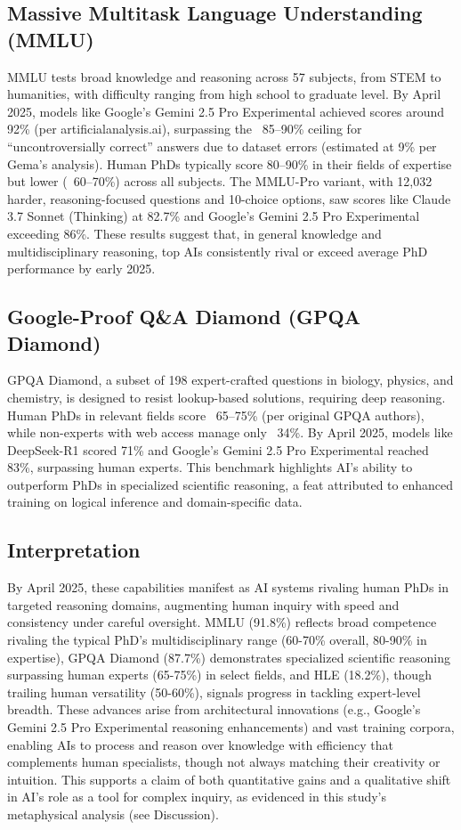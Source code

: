 \documentclass[11pt]{article}
\begin{document}
\subsection{Massive Multitask Language Understanding (MMLU)}
MMLU tests broad knowledge and reasoning across 57 subjects, from STEM to humanities, with difficulty ranging from high school to graduate level. By April 2025, models like Google’s Gemini 2.5 Pro Experimental achieved scores around 92\% (per artificialanalysis.ai), surpassing the ~85–90\% ceiling for “uncontroversially correct” answers due to dataset errors (estimated at 9\% per Gema’s analysis). Human PhDs typically score 80–90\% in their fields of expertise but lower (~60–70\%) across all subjects. The MMLU-Pro variant, with 12,032 harder, reasoning-focused questions and 10-choice options, saw scores like Claude 3.7 Sonnet (Thinking) at 82.7\% and Google’s Gemini 2.5 Pro Experimental exceeding 86\%. These results suggest that, in general knowledge and multidisciplinary reasoning, top AIs consistently rival or exceed average PhD performance by early 2025.

\subsection{Google-Proof Q\&A Diamond (GPQA Diamond)}
GPQA Diamond, a subset of 198 expert-crafted questions in biology, physics, and chemistry, is designed to resist lookup-based solutions, requiring deep reasoning. Human PhDs in relevant fields score ~65–75\% (per original GPQA authors), while non-experts with web access manage only ~34\%. By April 2025, models like DeepSeek-R1 scored 71\% and Google’s Gemini 2.5 Pro Experimental reached 83\%, surpassing human experts. This benchmark highlights AI’s ability to outperform PhDs in specialized scientific reasoning, a feat attributed to enhanced training on logical inference and domain-specific data.

\subsection{Interpretation}
By April 2025, these capabilities manifest as AI systems rivaling human PhDs in targeted reasoning domains, augmenting human inquiry with speed and consistency under careful oversight. MMLU (91.8\%) reflects broad competence rivaling the typical PhD’s multidisciplinary range (60-70\% overall, 80-90\% in expertise), GPQA Diamond (87.7\%) demonstrates specialized scientific reasoning surpassing human experts (65-75\%) in select fields, and HLE (18.2\%), though trailing human versatility (50-60\%), signals progress in tackling expert-level breadth. These advances arise from architectural innovations (e.g., Google’s Gemini 2.5 Pro Experimental reasoning enhancements) and vast training corpora, enabling AIs to process and reason over knowledge with efficiency that complements human specialists, though not always matching their creativity or intuition. This supports a claim of both quantitative gains and a qualitative shift in AI’s role as a tool for complex inquiry, as evidenced in this study’s metaphysical analysis (see Discussion).
\end{document}
